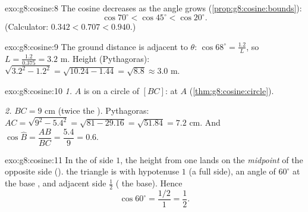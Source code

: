 \begin{solution}{exo:g8:cosine:8}
The cosine decreases as the angle grows
(\cref{prop:g8:cosine:bounds}):
\[
\cos 70^\circ < \cos 45^\circ < \cos 20^\circ .
\]
(Calculator: $0.342 < 0.707 < 0.940$.)
\end{solution}

\begin{solution}{exo:g8:cosine:9}
The ground distance is adjacent to $\theta$:
$\cos 68^\circ = \frac{1.2}{L}$, so
$L = \frac{1.2}{0.375} = 3.2$ m. Height (Pythagoras):
$\sqrt{3.2^2 - 1.2^2} = \sqrt{10.24 - 1.44} = \sqrt{8.8} \approx 3.0$
m.
\end{solution}

\begin{solution}{exo:g8:cosine:10}
\emph{1.} $A$ is on a circle of  $[BC]$:  at $A$
(\cref{thm:g8:cosine:circle}).

\emph{2.} $BC = 9$ cm (twice the ). Pythagoras:
$AC = \sqrt{9^2 - 5.4^2} = \sqrt{81 - 29.16} = \sqrt{51.84} = 7.2$
cm. And $\cos\widehat B = \dfrac{AB}{BC} = \dfrac{5.4}{9} = 0.6$.
\end{solution}

\begin{solution}{exo:g8:cosine:11}
In the  of side $1$, the height from one 
lands on the \emph{midpoint} of the opposite side ().  the triangle is  with hypotenuse $1$
(a full side), an angle of $60^\circ$ at the base , and
adjacent side $\frac12$ ( the base). Hence
\[
\cos 60^\circ = \frac{1/2}{1} = \frac12 .
\]
\end{solution}

